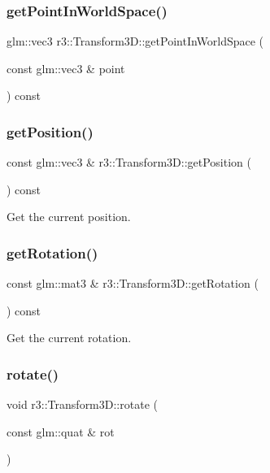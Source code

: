 \subsubsection{\texorpdfstring{get\+Point\+In\+World\+Space()}{getPointInWorldSpace()}}
{\footnotesize\ttfamily glm\+::vec3 r3\+::\+Transform3\+D\+::get\+Point\+In\+World\+Space (\begin{DoxyParamCaption}\item[{const glm\+::vec3 \&}]{point }\end{DoxyParamCaption}) const}

\mbox{\label{classr3_1_1_transform3_d_abe9ff86c845d54cd297ff00fd21aad71}} 
\subsubsection{\texorpdfstring{get\+Position()}{getPosition()}}
{\footnotesize\ttfamily const glm\+::vec3 \& r3\+::\+Transform3\+D\+::get\+Position (\begin{DoxyParamCaption}{ }\end{DoxyParamCaption}) const}

Get the current position. \mbox{\label{classr3_1_1_transform3_d_a1bad817e81d93f275ac71864fae763aa}} 
\subsubsection{\texorpdfstring{get\+Rotation()}{getRotation()}}
{\footnotesize\ttfamily const glm\+::mat3 \& r3\+::\+Transform3\+D\+::get\+Rotation (\begin{DoxyParamCaption}{ }\end{DoxyParamCaption}) const}

Get the current rotation. \mbox{\label{classr3_1_1_transform3_d_aaf633209948d35ca4b90422614a84478}} 
\subsubsection{\texorpdfstring{rotate()}{rotate()}}
{\footnotesize\ttfamily void r3\+::\+Transform3\+D\+::rotate (\begin{DoxyParamCaption}\item[{const glm\+::quat \&}]{rot }\end{DoxyParamCaption})}

